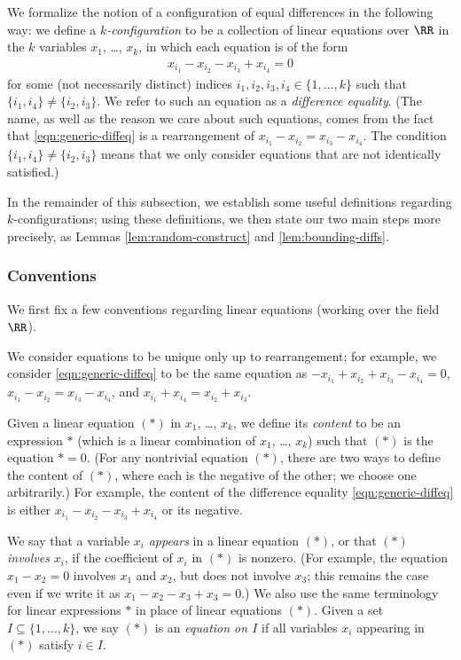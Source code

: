 We formalize the notion of a configuration of equal differences in the following way: we define a \emph{$k$-configuration} to be a collection of linear equations over $\RR$ in the $k$ variables $x_1$, \ldots, $x_k$, in which each equation is of the form \begin{align}
    x_{i_1} - x_{i_2} - x_{i_3} + x_{i_4} = 0 \label{eqn:generic-diffeq}
\end{align} 
for some (not necessarily distinct) indices $i_1, i_2, i_3, i_4 \in \{1, \ldots, k\}$ such that $\{i_1, i_4\} \neq \{i_2, i_3\}$. We refer to such an equation as a \emph{difference equality}. (The name, as well as the reason we care about such equations, comes from the fact that \eqref{eqn:generic-diffeq} is a rearrangement of $x_{i_1} - x_{i_2} = x_{i_3} - x_{i_4}$. The condition $\{i_1, i_4\} \neq \{i_2, i_3\}$ means that we only consider equations that are not identically satisfied.) 

In the remainder of this subsection, we establish some useful definitions regarding $k$-configurations; using these definitions, we then state our two main steps more precisely, as Lemmas \ref{lem:random-construct} and \ref{lem:bounding-diffs}. 

\subsubsection{Conventions} 

We first fix a few conventions regarding linear equations (working over the field $\RR$). 

We consider equations to be unique only up to rearrangement; for example, we consider \eqref{eqn:generic-diffeq} to be the same equation as $-x_{i_1} + x_{i_2} + x_{i_3} - x_{i_4} = 0$, $x_{i_1} - x_{i_2} = x_{i_3} - x_{i_4}$, and $x_{i_1} + x_{i_4} = x_{i_2} + x_{i_3}$. 

Given a linear equation $(*)$ in $x_1$, \ldots, $x_k$, we define its \emph{content} to be an expression $*$ (which is a linear combination of $x_1$, \ldots, $x_k$) such that $(*)$ is the equation ${*} = 0$. (For any nontrivial equation $(*)$, there are two ways to define the content of $(*)$, where each is the negative of the other; we choose one arbitrarily.) For example, the content of the difference equality \eqref{eqn:generic-diffeq} is either $x_{i_1} - x_{i_2} - x_{i_3} + x_{i_4}$ or its negative.

We say that a variable $x_i$ \emph{appears} in a linear equation $(*)$, or that $(*)$ \emph{involves} $x_i$, if the coefficient of $x_i$ in $(*)$ is nonzero. (For example, the equation $x_1 - x_2 = 0$ involves $x_1$ and $x_2$, but does not involve $x_3$; this remains the case even if we write it as $x_1 - x_2 - x_3 + x_3 = 0$.)  We also use the same terminology for linear expressions $*$ in place of linear equations $(*)$. Given a set $I \subseteq \{1, \ldots, k\}$, we say $(*)$ is an \emph{equation on $I$} if all variables $x_i$ appearing in $(*)$ satisfy $i \in I$. 

